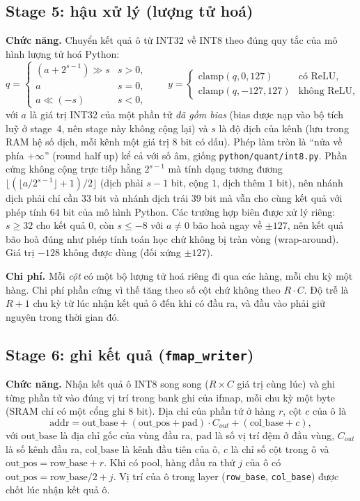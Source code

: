 \subsection{Stage 5: hậu xử lý (lượng tử hoá)}
\textbf{Chức năng.} Chuyển kết quả ô từ INT32 về INT8 theo đúng quy tắc của mô hình lượng tử hoá Python:
\begin{equation}\label{eq:requant}
  q=\begin{cases}(a+2^{s-1})\gg s & s>0,\\ a & s=0,\\ a\ll(-s) & s<0,\end{cases}\qquad
  y=\begin{cases}\mathrm{clamp}(q,0,127) & \text{có ReLU,}\\ \mathrm{clamp}(q,-127,127) & \text{không ReLU,}\end{cases}
\end{equation}
với $a$ là giá trị INT32 của một phần tử \emph{đã gồm bias} (bias được nạp vào bộ tích luỹ ở stage~4, nên stage này không cộng lại) và $s$ là độ dịch của kênh (lưu trong RAM hệ số dịch, mỗi kênh một giá trị $8$ bit có dấu).
Phép làm tròn là ``nửa về phía $+\infty$'' (round half up) kể cả với số âm, giống \texttt{python/quant/int8.py}.
Phần cứng không cộng trực tiếp hằng $2^{s-1}$ mà tính dạng tương đương $\big\lfloor(\lfloor a/2^{s-1}\rfloor+1)/2\big\rfloor$ (dịch phải $s-1$ bit, cộng $1$, dịch thêm $1$ bit), nên nhánh dịch phải chỉ cần $33$ bit và nhánh dịch trái $39$ bit mà vẫn cho cùng kết quả với phép tính $64$ bit của mô hình Python.
Các trường hợp biên được xử lý riêng: $s\ge32$ cho kết quả $0$, còn $s\le-8$ với $a\neq0$ bão hoà ngay về $\pm127$, nên kết quả bão hoà đúng như phép tính toán học chứ không bị tràn vòng (wrap-around).
Giá trị $-128$ không được dùng (đối xứng $\pm127$).

\textbf{Chi phí.} Mỗi \emph{cột} có một bộ lượng tử hoá riêng đi qua các hàng, mỗi chu kỳ một hàng. Chi phí phần cứng vì thế tăng theo số cột chứ không theo $R\cdot C$.
Độ trễ là $R+1$ chu kỳ từ lúc nhận kết quả ô đến khi có đầu ra, và đầu vào phải giữ nguyên trong thời gian đó.

\subsection{Stage 6: ghi kết quả (\texttt{fmap\_writer})}
\textbf{Chức năng.} Nhận kết quả ô INT8 song song ($R\times C$ giá trị cùng lúc) và ghi từng phần tử vào đúng vị trí trong bank ghi của ifmap, mỗi chu kỳ một byte (SRAM chỉ có một cổng ghi $8$ bit).
Địa chỉ của phần tử ở hàng $r$, cột $c$ của ô là
\begin{equation}\label{eq:wraddr}
  \mathrm{addr}=\mathrm{out\_base}+(\mathrm{out\_pos}+\mathrm{pad})\cdot C_{out}+(\mathrm{col\_base}+c),
\end{equation}
với $\mathrm{out\_base}$ là địa chỉ gốc của vùng đầu ra, $\mathrm{pad}$ là số vị trí đệm ở đầu vùng, $C_{out}$ là số kênh đầu ra, $\mathrm{col\_base}$ là kênh đầu tiên của ô, $c$ là chỉ số cột trong ô và $\mathrm{out\_pos}=\mathrm{row\_base}+r$. Khi có pool, hàng đầu ra thứ $j$ của ô có $\mathrm{out\_pos}=\mathrm{row\_base}/2+j$.
Vị trí của ô trong layer (\texttt{row\_base}, \texttt{col\_base}) được chốt lúc nhận kết quả ô.


